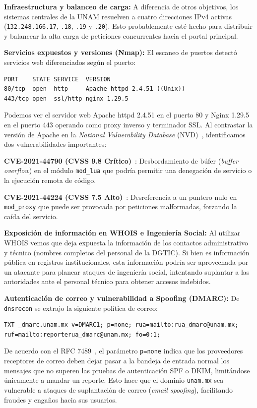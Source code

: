 \begin{itemizeColor}
    \item \textbf{Infraestructura y balanceo de carga:} 
    A diferencia de otros objetivos, los sistemas centrales de la UNAM resuelven a cuatro direcciones IPv4 activas (\texttt{132.248.166.17}, \texttt{.18}, \texttt{.19} y \texttt{.20}). Esto probablemente esté hecho para distribuir y balancear la alta carga de peticiones concurrentes hacia el portal principal.
    \item \textbf{Servicios expuestos y versiones (Nmap):}
    El escaneo de puertos detectó servicios web diferenciados según el puerto:
\begin{lstlisting}
PORT    STATE SERVICE  VERSION
80/tcp  open  http     Apache httpd 2.4.51 ((Unix))
443/tcp open  ssl/http nginx 1.29.5
\end{lstlisting}
		Podemos ver el servidor web Apache httpd 2.4.51 en el puerto 80 y Nginx 1.29.5 en el puerto 443 operando como proxy inverso y terminador SSL. Al contrastar la versión de Apache en la \textit{National Vulnerability Database} (NVD)~\cite{nvd_database}, identificamos dos vulnerabilidades importantes:
    \begin{enumerateColor}
        \item \textbf{CVE-2021-44790 (CVSS 9.8 Crítico)}~\cite{cve_2021_44790}: Desbordamiento de búfer (\textit{buffer overflow}) en el módulo \texttt{mod\_lua} que podría permitir una denegación de servicio o la ejecución remota de código.
        \item \textbf{CVE-2021-44224 (CVSS 7.5 Alto)}~\cite{cve_2021_44224}: Desreferencia a un puntero nulo en \texttt{mod\_proxy} que puede ser provocada por peticiones malformadas, forzando la caída del servicio.
    \end{enumerateColor}

    \item \textbf{Exposición de información en WHOIS e Ingeniería Social:}
    Al utilizar WHOIS vemos que deja expuesta la información de los contactos administrativo y técnico (nombres completos del personal de la DGTIC). Si bien es información pública en registros institucionales, esta información podría ser aprovechada por un atacante para planear ataques de ingeniería social, intentando suplantar a las autoridades ante el personal técnico para obtener accesos indebidos.

    \item \textbf{Autenticación de correo y vulnerabilidad a Spoofing (DMARC):}
    De \texttt{dnsrecon} se extrajo la siguiente política de correo:
\begin{lstlisting}
TXT _dmarc.unam.mx v=DMARC1; p=none; rua=mailto:rua_dmarc@unam.mx; ruf=mailto:reporterua_dmarc@unam.mx; fo=0:1;
\end{lstlisting}
    De acuerdo con el RFC 7489~\cite{rfc7489_dmarc}, el parámetro \texttt{p=none} indica que los proveedores receptores de correo deben dejar pasar a la bandeja de entrada normal los mensajes que no superen las pruebas de autenticación SPF o DKIM, limitándose únicamente a mandar un reporte. Esto hace que el dominio \texttt{unam.mx} sea vulnerable a ataques de suplantación de correo (\textit{email spoofing}), facilitando fraudes y engaños hacia sus usuarios.


\end{itemizeColor}
